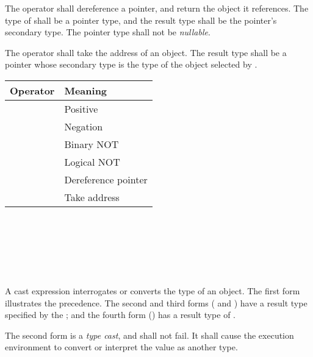 \specsubsubitem
The \terminal{*} operator shall dereference a pointer, and return the object it
references.  The type of  shall be a pointer
type, and the result type shall be the pointer's secondary type. The pointer
type shall not be \textit{nullable}.

\specsubsubitem
The \terminal{\&} operator shall take the address of an object. The result type
shall be a pointer whose secondary type is the type of the object selected by
.


\begin{tabular}{r | l }
Operator & Meaning \\
\hline
\terminal{+} & Positive \\
\terminal{-} & Negation \\
\terminal{\textasciitilde} & Binary NOT \\
\terminal{!} & Logical NOT \\
\terminal{*} & Dereference pointer \\
\terminal{\&} & Take address \\
\end{tabular}


\begin{grammar}
 \\
	 \\
	 \terminal{:}  \\
	   \\
	   \\
\end{grammar}

\specsubsubitem
A cast expression interrogates or converts the type of an object. The first
form illustrates the precedence. The second and third forms (\terminal{:} and
) have a result type specified by the ; and the
fourth form () has a result type of .

\specsubsubitem
The second form is a \textit{type cast}, and shall not fail. It shall cause the
execution environment to convert or interpret the value as another type.

